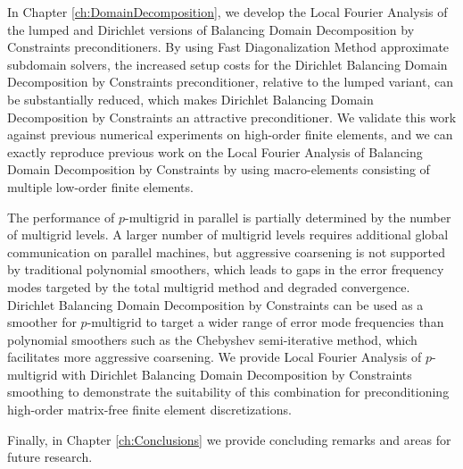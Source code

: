 In Chapter \ref{ch:DomainDecomposition}, we develop the Local Fourier Analysis of the lumped and Dirichlet versions of Balancing Domain Decomposition by Constraints preconditioners.
By using Fast Diagonalization Method approximate subdomain solvers, the increased setup costs for the Dirichlet Balancing Domain Decomposition by Constraints preconditioner, relative to the lumped variant, can be substantially reduced, which makes Dirichlet Balancing Domain Decomposition by Constraints an attractive preconditioner.
We validate this work against previous numerical experiments on high-order finite elements, and we can exactly reproduce previous work on the Local Fourier Analysis of Balancing Domain Decomposition by Constraints by using macro-elements consisting of multiple low-order finite elements.

The performance of $p$-multigrid in parallel is partially determined by the number of multigrid levels.
A larger number of multigrid levels requires additional global communication on parallel machines, but aggressive coarsening is not supported by traditional polynomial smoothers, which leads to gaps in the error frequency modes targeted by the total multigrid method and degraded convergence.
Dirichlet Balancing Domain Decomposition by Constraints can be used as a smoother for $p$-multigrid to target a wider range of error mode frequencies than polynomial smoothers such as the Chebyshev semi-iterative method, which facilitates more aggressive coarsening.
We provide Local Fourier Analysis of $p$-multigrid with Dirichlet Balancing Domain Decomposition by Constraints smoothing to demonstrate the suitability of this combination for preconditioning high-order matrix-free finite element discretizations.

Finally, in Chapter \ref{ch:Conclusions} we provide concluding remarks and areas for future research.
